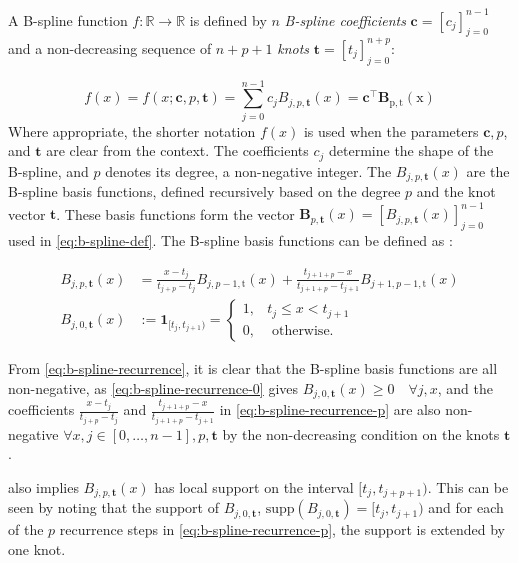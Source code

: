 A B-spline function $f: \mathbb{R} \rightarrow \mathbb{R}$ is defined by $n$ \emph{B-spline coefficients} $\mathbf{c} = [c_j]_{j=0}^{n-1}$ and a non-decreasing sequence of $n+p+1$ \emph{knots} $\mathbf{t} = [t_j]_{j=0}^{n+p}$:

\begin{equation}\label{eq:b-spline-def}
    f(x) = f(x ; \mathbf{c}, p, \mathbf{t})=\sum_{j=0}^{n-1} c_j B_{j, p, \mathbf{t}}(x)=\mathbf{c}^{\top} \mathbf{B}_{\mathrm{p}, \mathrm{t}}(\mathrm{x})
\end{equation}
Where appropriate, the shorter notation $f(x)$ is used when the parameters $\mathbf{c}, p$, and $\mathbf{t}$ are clear from the context. The coefficients $c_j$ determine the shape of the B-spline, and $p$ denotes its degree, a non-negative integer. The $B_{j, p, \mathbf{t}}(x)$ are the B-spline basis functions, defined recursively based on the degree $p$ and the knot vector $\mathbf{t}$. These basis functions form the vector $\mathbf{B}_{p, \mathbf{t}}(x) = [B_{j, p, \mathbf{t}}(x)]_{j=0}^{n-1}$ used in \cref{eq:b-spline-def}. The B-spline basis functions can be defined as \citep{deBoor1978practicalguide}:

\begin{subequations}\label{eq:b-spline-recurrence}
    \begin{align}
        B_{j, p, \mathbf{t}}(x) & =\frac{x-t_j}{t_{j+p}-t_j} B_{j, p-1, \mathrm{t}}(x)+\frac{t_{j+1+p}-x}{t_{j+1+p}-t_{j+1}} B_{j+1, p-1, \mathrm{t}}(x) \label{eq:b-spline-recurrence-p} \\
        B_{j, 0, \mathbf{t}}(x) & := 
        \mathbf 1_{[t_j, t_{j+1})} =
        \begin{cases}
            1, & t_j \leq x<t_{j+1} \\
            0, & \text { otherwise. }
        \end{cases} \label{eq:b-spline-recurrence-0}
    \end{align}
\end{subequations}

From \cref{eq:b-spline-recurrence}, it is clear that the B-spline basis functions are all non-negative, as \cref{eq:b-spline-recurrence-0} gives $B_{j, 0, \mathbf{t}}(x) \geq 0 \quad\forall j, x$, and the coefficients $\frac{x-t_j}{t_{j+p}-t_j}$ and $\frac{t_{j+1+p}-x}{t_{j+1+p}-t_{j+1}}$
in \cref{eq:b-spline-recurrence-p} are also non-negative $\forall x, j\in[0,\dots,n-1], p, \mathbf t$ by the non-decreasing condition on the knots $\mathbf t$. 

 also implies $B_{j, p, \mathbf{t}}(x)$ has local support on the interval $[t_j, t_{j+p+1})$. This can be seen by noting that the support of $B_{j, 0, \mathbf{t}}$, $\text{supp}(B_{j, 0, \mathbf{t}}) = [t_j, t_{j+1})$ and for each of the $p$ recurrence steps in \cref{eq:b-spline-recurrence-p}, the support is extended by one knot. 


